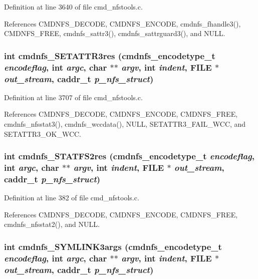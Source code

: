 Definition at line 3640 of file cmd\_\-nfstools.c.

References CMDNFS\_\-DECODE, CMDNFS\_\-ENCODE, cmdnfs\_\-fhandle3(), CMDNFS\_\-FREE, cmdnfs\_\-sattr3(), cmdnfs\_\-sattrguard3(), and NULL.
\subsubsection{\setlength{\rightskip}{0pt plus 5cm}int cmdnfs\_\-SETATTR3res ({\bf cmdnfs\_\-encodetype\_\-t} {\em encodeflag}, int {\em argc}, char $\ast$$\ast$ {\em argv}, int {\em indent}, FILE $\ast$ {\em out\_\-stream}, caddr\_\-t {\em p\_\-nfs\_\-struct})}\label{cmd__nfstools_8c_a110}




Definition at line 3707 of file cmd\_\-nfstools.c.

References CMDNFS\_\-DECODE, CMDNFS\_\-ENCODE, CMDNFS\_\-FREE, cmdnfs\_\-nfsstat3(), cmdnfs\_\-wccdata(), NULL, SETATTR3\_\-FAIL\_\-WCC, and SETATTR3\_\-OK\_\-WCC.
\subsubsection{\setlength{\rightskip}{0pt plus 5cm}int cmdnfs\_\-STATFS2res ({\bf cmdnfs\_\-encodetype\_\-t} {\em encodeflag}, int {\em argc}, char $\ast$$\ast$ {\em argv}, int {\em indent}, FILE $\ast$ {\em out\_\-stream}, caddr\_\-t {\em p\_\-nfs\_\-struct})}\label{cmd__nfstools_8c_a63}




Definition at line 382 of file cmd\_\-nfstools.c.

References CMDNFS\_\-DECODE, CMDNFS\_\-ENCODE, CMDNFS\_\-FREE, cmdnfs\_\-nfsstat2(), and NULL.
\subsubsection{\setlength{\rightskip}{0pt plus 5cm}int cmdnfs\_\-SYMLINK3args ({\bf cmdnfs\_\-encodetype\_\-t} {\em encodeflag}, int {\em argc}, char $\ast$$\ast$ {\em argv}, int {\em indent}, FILE $\ast$ {\em out\_\-stream}, caddr\_\-t {\em p\_\-nfs\_\-struct})}\label{cmd__nfstools_8c_a115}




